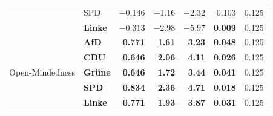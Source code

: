 \begin{table}[htbp]
\begin{tabular}{llrrrrr}
 & SPD            & $-$0.146 & $-$1.16 & $-$2.32 & 0.103 & 0.125 \\
 & \textbf{Linke} & $\mathbf{-0.313}$ & $\mathbf{-2.98}$ & $\mathbf{-5.97}$ & \textbf{0.009} & 0.125 \\
\midrule
\multirow{5}{*}{Open-Mindedness}
 & \textbf{AfD}   & \textbf{0.771} & \textbf{1.61} & \textbf{3.23} & \textbf{0.048} & 0.125 \\
 & \textbf{CDU}   & \textbf{0.646} & \textbf{2.06} & \textbf{4.11} & \textbf{0.026} & 0.125 \\
 & \textbf{Gr\"une} & \textbf{0.646} & \textbf{1.72} & \textbf{3.44} & \textbf{0.041} & 0.125 \\
 & \textbf{SPD}   & \textbf{0.834} & \textbf{2.36} & \textbf{4.71} & \textbf{0.018} & 0.125 \\
 & \textbf{Linke} & \textbf{0.771} & \textbf{1.93} & \textbf{3.87} & \textbf{0.031} & 0.125 \\
\bottomrule
\end{tabular}
\end{table}